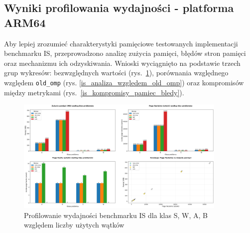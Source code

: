 \subsection{Wyniki profilowania wydajności - platforma ARM64}
Aby lepiej zrozumieć charakterystyki pamięciowe testowanych implementacji benchmarku IS, przeprowadzono analizę zużycia pamięci, błędów stron pamięci oraz mechanizmu ich odzyskiwania. Wnioski wyciągnięto na podstawie trzech grup wykresów: bezwzględnych wartości \mbox{(rys. \ref{is_porownanie_zuzycia_pamieci})}, porównania względnego względem \texttt{old\_omp} (rys. \ref{is_analiza_wzgledem_old_omp}) oraz kompromisów między metrykami \mbox{(rys. \ref{is_kompromisy_pamiec_bledy})}.
\begin{figure}[!h]
    \centering
    \includegraphics[width=0.9\textwidth]{analiza/images/parallel/is/arm/chart_01_memory_comparison.png}
    \caption{Profilowanie wydajności benchmarku IS dla klas S, W, A, B względem liczby użytych wątków}
    \label{is_porownanie_zuzycia_pamieci}
\end{figure}
